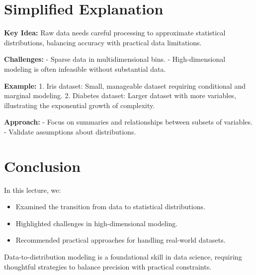 \documentclass{article}
\begin{document}
\section*{Simplified Explanation}

\textbf{Key Idea:}
Raw data needs careful processing to approximate statistical distributions, balancing accuracy with practical data limitations.

\textbf{Challenges:}
- Sparse data in multidimensional bins.
- High-dimensional modeling is often infeasible without substantial data.

\textbf{Example:}
1. Iris dataset: Small, manageable dataset requiring conditional and marginal modeling.
2. Diabetes dataset: Larger dataset with more variables, illustrating the exponential growth of complexity.

\textbf{Approach:}
- Focus on summaries and relationships between subsets of variables.
- Validate assumptions about distributions.

\section*{Conclusion}

In this lecture, we:
\begin{itemize}
  \item Examined the transition from data to statistical distributions.
  \item Highlighted challenges in high-dimensional modeling.
  \item Recommended practical approaches for handling real-world datasets.
\end{itemize}

Data-to-distribution modeling is a foundational skill in data science, requiring thoughtful strategies to balance precision with practical constraints.
\end{document}

